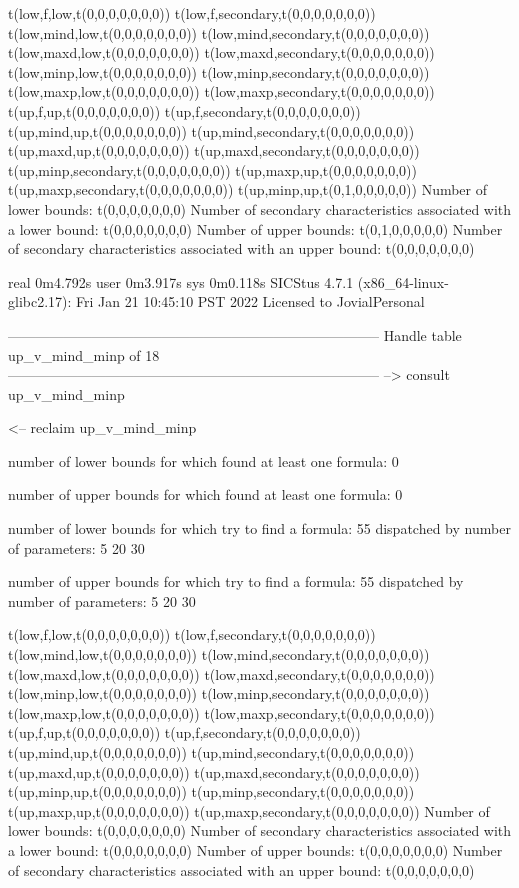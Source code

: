 t(low,f,low,t(0,0,0,0,0,0,0))
t(low,f,secondary,t(0,0,0,0,0,0,0))
t(low,mind,low,t(0,0,0,0,0,0,0))
t(low,mind,secondary,t(0,0,0,0,0,0,0))
t(low,maxd,low,t(0,0,0,0,0,0,0))
t(low,maxd,secondary,t(0,0,0,0,0,0,0))
t(low,minp,low,t(0,0,0,0,0,0,0))
t(low,minp,secondary,t(0,0,0,0,0,0,0))
t(low,maxp,low,t(0,0,0,0,0,0,0))
t(low,maxp,secondary,t(0,0,0,0,0,0,0))
t(up,f,up,t(0,0,0,0,0,0,0))
t(up,f,secondary,t(0,0,0,0,0,0,0))
t(up,mind,up,t(0,0,0,0,0,0,0))
t(up,mind,secondary,t(0,0,0,0,0,0,0))
t(up,maxd,up,t(0,0,0,0,0,0,0))
t(up,maxd,secondary,t(0,0,0,0,0,0,0))
t(up,minp,secondary,t(0,0,0,0,0,0,0))
t(up,maxp,up,t(0,0,0,0,0,0,0))
t(up,maxp,secondary,t(0,0,0,0,0,0,0))
t(up,minp,up,t(0,1,0,0,0,0,0))
Number of lower bounds:                                             t(0,0,0,0,0,0,0)
Number of secondary characteristics associated with a lower bound:  t(0,0,0,0,0,0,0)
Number of upper bounds:                                             t(0,1,0,0,0,0,0)
Number of secondary characteristics associated with an upper bound: t(0,0,0,0,0,0,0)

real	0m4.792s
user	0m3.917s
sys	0m0.118s
SICStus 4.7.1 (x86_64-linux-glibc2.17): Fri Jan 21 10:45:10 PST 2022
Licensed to JovialPersonal


--------------------------------------------------------------------------------
Handle table up_v_mind_minp of 18
--------------------------------------------------------------------------------
--> consult up_v_mind_minp

<-- reclaim up_v_mind_minp

number of lower bounds for which found at least one formula: 0

number of upper bounds for which found at least one formula: 0

number of lower bounds for which try to find a formula: 55
dispatched by number of parameters: 5  20  30

number of upper bounds for which try to find a formula: 55
dispatched by number of parameters: 5  20  30

t(low,f,low,t(0,0,0,0,0,0,0))
t(low,f,secondary,t(0,0,0,0,0,0,0))
t(low,mind,low,t(0,0,0,0,0,0,0))
t(low,mind,secondary,t(0,0,0,0,0,0,0))
t(low,maxd,low,t(0,0,0,0,0,0,0))
t(low,maxd,secondary,t(0,0,0,0,0,0,0))
t(low,minp,low,t(0,0,0,0,0,0,0))
t(low,minp,secondary,t(0,0,0,0,0,0,0))
t(low,maxp,low,t(0,0,0,0,0,0,0))
t(low,maxp,secondary,t(0,0,0,0,0,0,0))
t(up,f,up,t(0,0,0,0,0,0,0))
t(up,f,secondary,t(0,0,0,0,0,0,0))
t(up,mind,up,t(0,0,0,0,0,0,0))
t(up,mind,secondary,t(0,0,0,0,0,0,0))
t(up,maxd,up,t(0,0,0,0,0,0,0))
t(up,maxd,secondary,t(0,0,0,0,0,0,0))
t(up,minp,up,t(0,0,0,0,0,0,0))
t(up,minp,secondary,t(0,0,0,0,0,0,0))
t(up,maxp,up,t(0,0,0,0,0,0,0))
t(up,maxp,secondary,t(0,0,0,0,0,0,0))
Number of lower bounds:                                             t(0,0,0,0,0,0,0)
Number of secondary characteristics associated with a lower bound:  t(0,0,0,0,0,0,0)
Number of upper bounds:                                             t(0,0,0,0,0,0,0)
Number of secondary characteristics associated with an upper bound: t(0,0,0,0,0,0,0)

